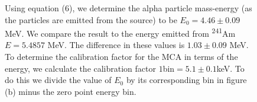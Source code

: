 \documentclass[a4paper]{article}
\begin{document}
\begin{figure}[!htbp]
\caption{
Using equation (6), we determine the alpha particle mass-energy (as the particles are emitted from the source) to be $E_0 = 4.46 \pm 0.09$ MeV. We compare the result to the energy emitted from \textsuperscript{241}Am\cite{SPA} $E = 5.4857$ MeV. The difference in these values is $1.03 \pm 0.09$ MeV.
To determine the calibration factor for the MCA in terms of the energy, we calculate the calibration factor $1$bin$ = 5.1 \pm 0.1$keV. To do this we divide the value of $E_0$ by its corresponding bin in figure (b) minus the zero point energy bin.
}
\end{figure}
\end{document}

